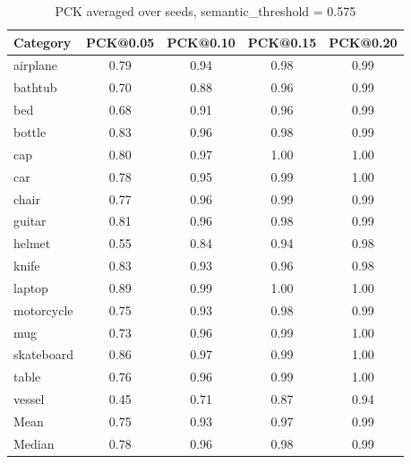 \begin{table}[h]
\centering
\caption{PCK averaged over seeds, semantic\_threshold = 0.575}
\label{tab:pck_thresh_0_85}
\begin{tabular}{lcccc}
\toprule
Category & PCK@0.05 & PCK@0.10 & PCK@0.15 & PCK@0.20 \\
\midrule
airplane & 0.79 & 0.94 & 0.98 & 0.99 \\
bathtub & 0.70 & 0.88 & 0.96 & 0.99 \\
bed & 0.68 & 0.91 & 0.96 & 0.99 \\
bottle & 0.83 & 0.96 & 0.98 & 0.99 \\
cap & 0.80 & 0.97 & 1.00 & 1.00 \\
car & 0.78 & 0.95 & 0.99 & 1.00 \\
chair & 0.77 & 0.96 & 0.99 & 0.99 \\
guitar & 0.81 & 0.96 & 0.98 & 0.99 \\
helmet & 0.55 & 0.84 & 0.94 & 0.98 \\
knife & 0.83 & 0.93 & 0.96 & 0.98 \\
laptop & 0.89 & 0.99 & 1.00 & 1.00 \\
motorcycle & 0.75 & 0.93 & 0.98 & 0.99 \\
mug & 0.73 & 0.96 & 0.99 & 1.00 \\
skateboard & 0.86 & 0.97 & 0.99 & 1.00 \\
table & 0.76 & 0.96 & 0.99 & 1.00 \\
vessel & 0.45 & 0.71 & 0.87 & 0.94 \\
\midrule
Mean & 0.75 & 0.93 & 0.97 & 0.99 \\
Median & 0.78 & 0.96 & 0.98 & 0.99 \\
\bottomrule
\end{tabular}
\end{table}

